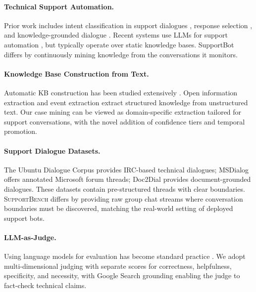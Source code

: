 \documentclass[11pt]{article}
\newcommand{\supportbench}{\textsc{SupportBench}}
\begin{document}
\paragraph{Technical Support Automation.} Prior work includes intent classification in support dialogues \citep{qu2019user,qu2018analyzing}, response selection \citep{wu2017sequential}, and knowledge-grounded dialogue \citep{dinan2019wizard,kim2020sequential}. Recent systems use LLMs for support automation \citep{chen2023teaching}, but typically operate over static knowledge bases. SupportBot differs by continuously mining knowledge from the conversations it monitors.

\paragraph{Knowledge Base Construction from Text.} Automatic KB construction has been studied extensively \citep{carlson2010toward,mitchell2018never}. Open information extraction \citep{banko2007open,angeli2015leveraging} and event extraction \citep{du2020event} extract structured knowledge from unstructured text. Our case mining can be viewed as domain-specific extraction tailored for support conversations, with the novel addition of confidence tiers and temporal promotion.

\paragraph{Support Dialogue Datasets.} The Ubuntu Dialogue Corpus \citep{lowe2015ubuntu} provides IRC-based technical dialogues; MSDialog \citep{qu2018analyzing} offers annotated Microsoft forum threads; Doc2Dial \citep{feng2020doc2dial} provides document-grounded dialogues. These datasets contain pre-structured threads with clear boundaries. \supportbench{} differs by providing raw group chat streams where conversation boundaries must be discovered, matching the real-world setting of deployed support bots.

\paragraph{LLM-as-Judge.} Using language models for evaluation has become standard practice \citep{zheng2023judging,dubois2024alpacafarm,li2024generation}. We adopt multi-dimensional judging with separate scores for correctness, helpfulness, specificity, and necessity, with Google Search grounding enabling the judge to fact-check technical claims.
\end{document}
